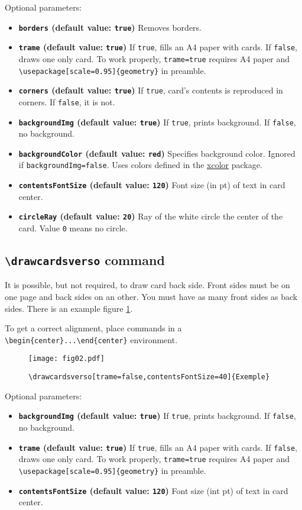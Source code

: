 \documentclass[a4paper, 12pt]{article}
\newcommand{\key}[3]{\textbf{\texttt{#1} (default value: \texttt{#2})} #3}
\newcommand{\commande}[1]{\texttt{\textbackslash#1}}
\begin{document}
Optional parameters:
\begin{itemize}
	\item \key{borders}{true}{Removes borders.}
	\item \key{trame}{true}{If \texttt{true}, fills an A4 paper with cards. If \texttt{false}, draws one only card. To work properly, \texttt{trame=true} requires A4 paper and \commande{usepackage[scale=0.95]\{geometry\}} in preamble.}
	\item \key{corners}{true}{If \texttt{true}, card's contents is reproduced in corners. If \texttt{false}, it is not.}
	\item \key{backgroundImg}{true}{If \texttt{true}, prints background. If \texttt{false}, no background.}
	\item \key{backgroundColor}{red}{Specifies background color. Ignored if \texttt{backgroundImg=false}. Uses colors defined in the \href{https://www.ctan.org/pkg/xcolor}{xcolor} package.}
	\item \key{contentsFontSize}{120}{Font size (in pt) of text in card center.}
	\item \key{circleRay}{20}{Ray of the white circle the center of the card. Value \texttt 0 means no circle.}
\end{itemize}


	\subsection{\commande{drawcardsverso} command}
It is possible, but not required, to draw card back side. Front sides must be on one page and back sides on an other. You must have as many front sides as back sides. There is an example figure \ref{fig:verso}.

To get a correct alignment, place commands in a  \verb!\begin{center}...\end{center}! environment.
\begin{figure}[h]\begin{center}
	\caption{\commande{drawcardsverso[trame=false,contentsFontSize=40]\{Exemple\}}}
	\texttt{[image: fig02.pdf]}\label{fig:verso}
\end{center}\end{figure}

Optional parameters:
\begin{itemize}
	\item \key{backgroundImg}{true}{If \texttt{true}, prints background. If \texttt{false}, no background.}
	\item \key{trame}{true}{If \texttt{true}, fills an A4 paper with cards. If \texttt{false}, draws one only card. To work properly, \texttt{trame=true} requires A4 paper and \commande{usepackage[scale=0.95]\{geometry\}} in preamble.}
	\item \key{contentsFontSize}{120}{Font size (int pt) of text in card center.}
\end{itemize}
\end{document}
